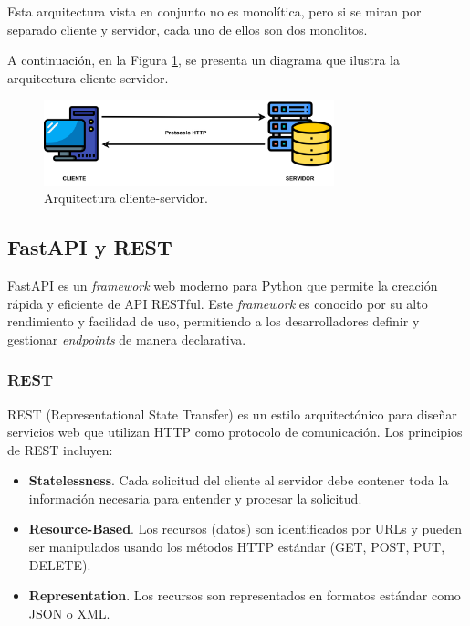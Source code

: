 Esta arquitectura vista en conjunto no es monolítica, pero si se miran por separado cliente y servidor, cada uno de ellos son dos monolitos.

A continuación, en la Figura \ref{fig:arquitectura}, se presenta un diagrama que ilustra la arquitectura cliente-servidor.

\begin{figure}[!h]
    \centering
    \includegraphics[width=0.75\textwidth]{img/cliente_servidor.png}
    \caption[Arquitectura cliente-servidor.]{Arquitectura cliente-servidor\protect\footnotemark.}
    \label{fig:arquitectura}
\end{figure}


\subsection{FastAPI y REST}

FastAPI es un \textit{framework} web moderno para Python que permite la creación rápida y eficiente de API RESTful. Este \textit{framework} es conocido por su alto rendimiento y facilidad de uso, permitiendo a los desarrolladores definir y gestionar \textit{endpoints} de manera declarativa.

\subsubsection{REST}

REST (Representational State Transfer) es un estilo arquitectónico para diseñar servicios web que utilizan HTTP como protocolo de comunicación. Los principios de REST incluyen:

\begin{itemize}
    \item \textbf{Statelessness}. Cada solicitud del cliente al servidor debe contener toda la información necesaria para entender y procesar la solicitud.
    \item \textbf{Resource-Based}. Los recursos (datos) son identificados por URLs y pueden ser manipulados usando los métodos HTTP estándar (GET, POST, PUT, DELETE).
    \item \textbf{Representation}. Los recursos son representados en formatos estándar como JSON o XML.
\end{itemize}


